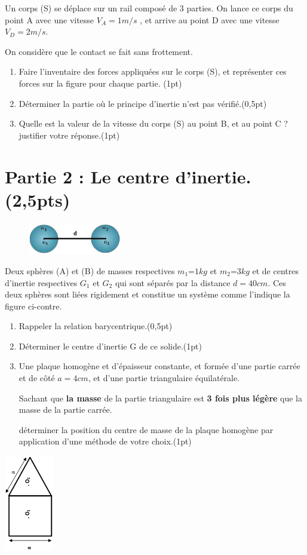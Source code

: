\documentclass[12pt]{article}
\begin{document}
Un corps (S) se déplace sur un rail composé de 3 parties. On
lance ce corps du point A avec une vitesse $V_A=1m/s$ , et arrive au point D avec une vitesse $V_D=2m/s$. 

On considère que le contact se fait sans frottement.

\begin{enumerate}
	\item Faire l’inventaire des forces appliquées sur le corps (S), et représenter ces forces sur la figure pour
chaque partie. \dotfill(1pt)
\item Déterminer la partie où le principe d’inertie n’est pas vérifié.\dotfill(0,5pt)
\item Quelle est la valeur de la vitesse du corps (S) au point B, et au point C ? justifier votre réponse.\dotfill(1pt)
\end{enumerate}

\section*{Partie 2 : Le centre d'inertie. \dotfill(2,5pts)}

\begin{figure}
	\vspace{-0.8cm}
	\includegraphics[width=0.36\textwidth]{./img/ex3.png}
\end{figure}


Deux sphères (A) et (B) de masses respectives $m_1$=$1kg$ et $m_2$=$3kg$ et de centres d’inertie respectives $G_1$ et $G_2$ qui sont séparés par la distance $d = 40 cm$. Ces deux sphères sont liées rigidement et constitue un système comme l’indique la figure ci-contre.

\begin{enumerate}

\item Rappeler la relation barycentrique.\dotfill(0,5pt)
\item Déterminer le centre d’inertie G de ce solide.\dotfill(1pt)
\item Une plaque homogène et d’épaisseur constante, et formée d’une partie carrée et de côté $a=4cm$, et d’une partie triangulaire équilatérale.

	Sachant que \textbf{la masse} de la partie triangulaire est \textbf{3 fois plus légère} que la masse de la partie carrée.

	déterminer la position du centre de masse de la plaque homogène par application d’une méthode de votre choix.\dotfill(1pt)
\end{enumerate}

 \begin{center}
	\includegraphics[width=0.16\textwidth]{./img/ex4.png}
\end{center}
\end{document}
